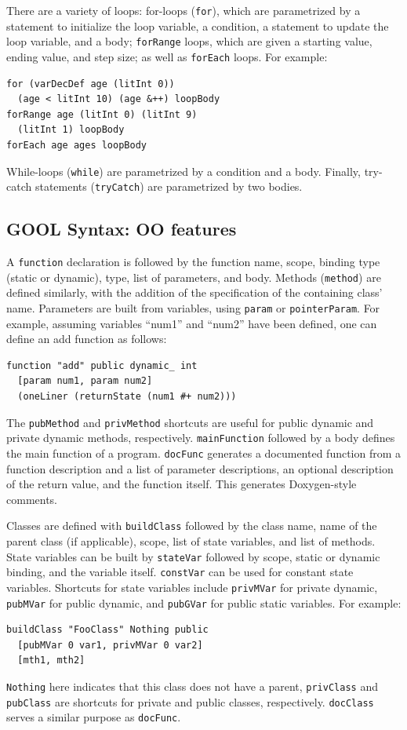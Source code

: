 \documentclass[sigplan,review,anonymous,prologue,dvipsnames]{acmart}
\begin{document}
There are a variety of loops: for-loops (\verb|for|), which are
parametrized by a statement to
initialize the loop variable, a condition, a statement to update the loop
variable, and a body; \verb|forRange| loops, which are given a
starting value, ending value, and step size; as well as \verb|forEach|
loops.
For example:
\begin{lstlisting}
for (varDecDef age (litInt 0))
  (age < litInt 10) (age &++) loopBody
forRange age (litInt 0) (litInt 9)
  (litInt 1) loopBody
forEach age ages loopBody
\end{lstlisting}
While-loops (\verb|while|) are parametrized by a condition and a body. Finally,
try-catch statements (\verb|tryCatch|) are parametrized by two bodies.

\subsection{GOOL Syntax: OO features}

A \verb|function| declaration is followed by the function
name, scope, binding type (static or dynamic), type, list of parameters, and
body. Methods (\verb|method|) are defined similarly, with the addition of the
specification of the containing class' name.  Parameters are built from
variables, using \verb|param| or \verb|pointerParam|. For example, assuming
variables ``num1'' and ``num2'' have been defined, one can define an
\textsf{add} function as follows:
\begin{lstlisting}
function "add" public dynamic_ int
  [param num1, param num2]
  (oneLiner (returnState (num1 #+ num2)))
\end{lstlisting}
The  \verb|pubMethod| and \verb|privMethod| shortcuts are useful for public
dynamic and private dynamic methods, respectively. \verb|mainFunction|
followed by a body defines the main function of a program. \verb|docFunc|
generates a documented function from a function description and
a list of parameter descriptions, an optional description of the return
value, and the function itself.  This generates Doxygen-style comments.

Classes are defined with \verb|buildClass| followed by the class name, name of
the parent class (if applicable), scope, list of state variables, and list of
methods. State variables can be built by \verb|stateVar| followed by scope, 
static or dynamic binding, and the variable itself.  \verb|constVar| can be 
used for constant state
variables. Shortcuts for state variables include \verb|privMVar| for private
dynamic, \verb|pubMVar| for public dynamic, and \verb|pubGVar| for public
static variables. For example:
\begin{lstlisting}
buildClass "FooClass" Nothing public
  [pubMVar 0 var1, privMVar 0 var2]
  [mth1, mth2]
\end{lstlisting}
\verb|Nothing| here indicates that this class does not have a parent,
\verb|privClass| and \verb|pubClass| are shortcuts for private and public
classes, respectively. \verb|docClass| serves a similar purpose as \verb|docFunc|.
\end{document}
